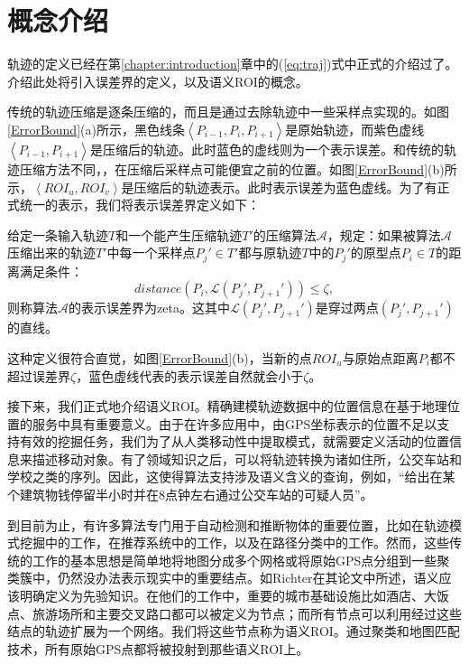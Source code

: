 \section{概念介绍}
轨迹的定义已经在第\ref{chapter:introduction}章中的(\ref{eq:traj})式中正式的介绍过了。介绍此处将引入误差界的定义，以及语义ROI的概念。


传统的轨迹压缩是逐条压缩的，而且是通过去除轨迹中一些采样点实现的。如图\ref{ErrorBound}(a)所示，黑色线条$\left<P_{i-1},P_{i},P_{i+1}\right>$是原始轨迹，而紫色虚线$\left<P_{i-1},P_{i+1}\right>$是压缩后的轨迹。此时蓝色的虚线则为一个表示误差。和传统的轨迹压缩方法不同，，在压缩后采样点可能便宜之前的位置。如图\ref{ErrorBound}(b)所示，$\left<ROI_{u},ROI_{v}\right>$是压缩后的轨迹表示。此时表示误差为蓝色虚线。为了有正式统一的表示，我们将表示误差界定义如下：

\begin{dingyi}[表示误差界]
给定一条输入轨迹$T$和一个能产生压缩轨迹$T'$的压缩算法$\mathcal{A}$，规定：如果被算法$\mathcal{A}$压缩出来的轨迹$T'$中每一个采样点$P_j' \in T'$都与原轨迹$T$中的$P_j'$的原型点$P_i \in T$的距离满足条件：
\begin{equation}
\label{eq:errorbound}
{distance}\left(P_i,\mathcal{L}(P_j',P_{j+1}')\right) \le \zeta,
\end{equation}
则称算法$\mathcal{A}$的表示误差界为\gls{zeta}。这其中$\mathcal{L}(P_j',P_{j+1}')$是穿过两点$(P_j',P_{j+1}')$的直线。
\end{dingyi}
这种定义很符合直觉，如图\ref{ErrorBound}(b)，当新的点$ROI_{u}$与原始点距离$P_i$都不超过误差界$\zeta$，蓝色虚线代表的表示误差自然就会小于$\zeta$。

接下来，我们正式地介绍语义ROI。精确建模轨迹数据中的位置信息在基于地理位置的服务中具有重要意义。由于在许多应用中，由GPS坐标表示的位置不足以支持有效的挖掘任务，我们为了从人类移动性中提取模式，就需要定义活动的位置信息来描述移动对象。有了领域知识之后，可以将轨迹转换为诸如住所，公交车站和学校之类的序列。因此，这使得算法支持涉及语义含义的查询，例如，“给出在某个建筑物钱停留半小时并在8点钟左右通过公交车站的可疑人员”。

到目前为止，有许多算法专门用于自动检测和推断物体的重要位置，比如在轨迹模式挖掘中的工作\cite{giannotti2007trajectory,liao2007extracting,wang2013mining}，在推荐系统中的工作\cite{tsai2015location,zheng2011recommending,si2017ctf}，以及在路径分类中的工作\cite{lee2008traclass,lv2015measuring}。然而，这些传统的工作的基本思想是简单地将地图分成多个网格或将原始GPS点分组到一些聚类簇中，仍然没办法表示现实中的重要结点。如Richter在其论文\cite{richter2012semantic}中所述，语义应该明确定义为先验知识。在他们的工作中，重要的城市基础设施比如酒店、大饭点、旅游场所和主要交叉路口都可以被定义为节点；而所有节点可以利用经过这些结点的轨迹扩展为一个网络。我们将这些节点称为语义ROI。通过聚类和地图匹配技术，所有原始GPS点都将被投射到那些语义ROI上。


